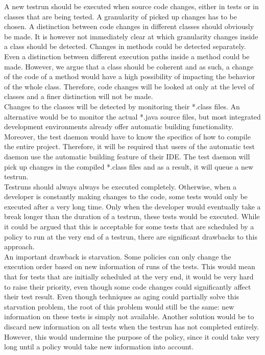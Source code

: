 \documentclass[i2]{oss}
\begin{document}
A new testrun should be executed when source code changes, either in tests or in classes that are being tested. 
A granularity of picked up changes has to be chosen.
A distinction between code changes in different classes should obviously be made.
It is however not immediately clear at which granularity changes inside a class should be detected.
Changes in methods could be detected separately.
Even a distinction between different execution paths inside a method could be made.
However, we argue that a class should be coherent and as such, a change of the code of a method would have a high possibility of impacting the behavior of the whole class.
Therefore, code changes will be looked at only at the level of classes and a finer distinction will not be made.\\

Changes to the classes will be detected by monitoring their *.class files.
An alternative would be to monitor the actual *.java source files, but most integrated development environments already offer automatic building functionality.
Moreover, the test daemon would have to know the specifics of how to compile the entire project. 
Therefore, it will be required that users of the automatic test daemon use the automatic building feature of their IDE.
The test daemon will pick up changes in the compiled *.class files and as a result, it will queue a new testrun.\\

Testruns should always always be executed completely.
Otherwise, when a developer is constantly making changes to the code, some tests would only be executed after a very long time.
Only when the developer would eventually take a break longer than the duration of a testrun, these tests would be executed.
While it could be argued that this is acceptable for some tests that are scheduled by a policy to run at the very end of a testrun, there are significant drawbacks to this approach.\\

An important drawback is starvation. Some policies can only change the execution order based on new information of runs of the tests.
This would mean that for tests that are initially scheduled at the very end, it would be very hard to raise their priority, even though some code changes could significantly affect their test result.
Even though techniques as aging could partially solve this starvation problem, the root of this problem would still be the same: new information on these tests is simply not available. Another solution would be to discard new information on all tests when the testrun has not completed entirely. However, this would undermine the purpose of the policy, since it could take very long until a policy would take new information into account.\\
\end{document}
